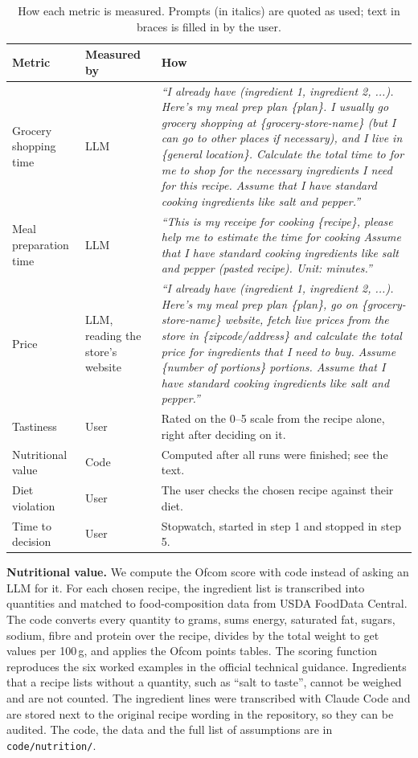 \documentclass[11pt]{article}
\newcommand{\hd}[1]{\leavevmode\sffamily\bfseries\color{ink}#1}
\newcommand{\lead}[1]{{\sffamily\bfseries\color{accent}#1}\hspace{0.5em}}
\begin{document}
\begin{table}[!htb]
\small
\begin{tabular}{@{}P{3.0cm} P{2.4cm} P{10.25cm}@{}}
\toprule
{} \hd{Metric} & \hd{Measured by} & \hd{How} \\
\midrule
Grocery shopping time & LLM &
\emph{``I already have (ingredient 1, ingredient 2, ...). Here's my meal prep plan \{plan\}.
I usually go grocery shopping at \{grocery-store-name\} (but I can go to other places if necessary), and I live in \{general location\}.
Calculate the total time to for me to shop for the necessary ingredients I need for this recipe.
Assume that I have standard cooking ingredients like salt and pepper.''} \\
Meal preparation time & LLM &
\emph{``This is my receipe for cooking \{recipe\}, please help me to estimate the time for cooking
Assume that I have standard cooking ingredients like salt and pepper (pasted recipe). Unit: minutes.''} \\
Price & LLM, reading the store's website &
\emph{``I already have (ingredient 1, ingredient 2, ...). Here's my meal prep plan \{plan\},
go on \{grocery-store-name\} website, fetch live prices from the store in \{zipcode/address\} and calculate the total price for ingredients that I need to buy.
Assume \{number of portions\} portions. Assume that I have standard cooking ingredients like salt and pepper.''} \\
Tastiness & User & Rated on the 0--5 scale from the recipe alone, right after deciding on it. \\
Nutritional value & Code & Computed after all runs were finished; see the text. \\
Diet violation & User & The user checks the chosen recipe against their diet. \\
Time to decision & User & Stopwatch, started in step 1 and stopped in step 5. \\
\bottomrule
\end{tabular}
\caption{How each metric is measured. Prompts (in italics) are quoted as used; text in braces is filled in by the user.}
\label{tab:eval}
\end{table}

\lead{Nutritional value.}
We compute the Ofcom score with code instead of asking an LLM for it.
For each chosen recipe, the ingredient list is transcribed into quantities and matched to food-composition data from USDA FoodData Central.
The code converts every quantity to grams, sums energy, saturated fat, sugars, sodium, fibre and protein over the recipe,
divides by the total weight to get values per 100\,g, and applies the Ofcom points tables.
The scoring function reproduces the six worked examples in the official technical guidance.
Ingredients that a recipe lists without a quantity, such as ``salt to taste'', cannot be weighed and are not counted.
The ingredient lines were transcribed with Claude Code and are stored next to the original recipe wording in the repository, so they can be audited.
The code, the data and the full list of assumptions are in \texttt{code/nutrition/}.
\end{document}
